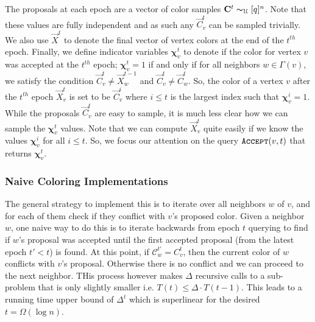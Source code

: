 The proposals at each epoch are a vector of color samples $\vec C^{t} \thicksim_{\mathcal U} [q]^n$.
Note that these values are fully independent and as such any $\vec C^t_v$ can be sampled trivially.
We also use $\vec X^t$ to denote the final vector of vertex colors at the end of the $t^{th}$ epoch.
Finally, we define indicator variables $\bm \chi^t_v$ to denote if the color for vertex $v$ was accepted at the $t^{th}$ epoch;
$\bm \chi^t_v = 1$ if and only if for all neighbors $w\in \Gamma(v)$,
we satisfy the condition $\vec  C^t_v\not= \vec X^{t-1}_w$ and $\vec C^t_v\not= \vec C^t_w$.
So, the color of a vertex $v$ after the $t^{th}$ epoch $\vec X^t_v$ is set to be $\vec C^i_v$
where $i\le t$ is the largest index such that $\bm \chi^i_v=1$.
While the proposals $\vec C^t_v$ are easy to sample, it is much less clear how we can sample the $\bm \chi^t_v$ values.
Note that we can compute $\vec X^t_v$ quite easily if we know the values $\bm\chi^i_v$ for all $i\le t$.
So, we focus our attention on the query $\func{Accept}(v,t)$ that returns $\bm\chi^t_v$.


\subsubsection{Naive Coloring Implementations}%
\label{sec:naive_coloring_implementations}
The general strategy to implement this is to iterate over all neighbors $w$ of $v$,
and for each of them check if they conflict with $v$'s proposed color.
Given a neighbor $w$, one naive way to do this is to iterate backwards from epoch $t$ querying to find if $w$'s proposal was accepted
until the first accepted proposal (from the latest epoch $t' < t$) is found.
At this point, if $\mathcal C^{t'}_w = C^t_v$, then the current color of $w$ conflicts with $v$'s proposal.
Otherwise there is no conflict and we can proceed to the next neighbor.
THis process however makes $\Delta$ recursive calls to a sub-problem that is only slightly smaller i.e. $T(t) \le \Delta\cdot T(t-1)$.
This leads to a running time upper bound of $\Delta^{t}$ which is superlinear for the desired $t = \Omega(\log n)$.

